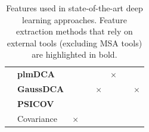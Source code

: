 \begin{landscape}
\begin{table}[H]
\begin{tabular}{llcccccc}
                    & \textbf{plmDCA} & & & & $\times$ & & \\
                    & \textbf{GaussDCA} & & & $\times$ & & & $\times$ \\
                    & \textbf{PSICOV} & & & & & & \\
                    & Covariance & $\times$ & & & & & \\
                    \hline
                \end{tabular}
                    \caption{Features used in state-of-the-art deep learning approaches.
                        Feature extraction methods that rely on external tools (excluding
                        MSA tools) are highlighted in bold.}
                    \label{features}
            \end{table}
        \end{landscape}
